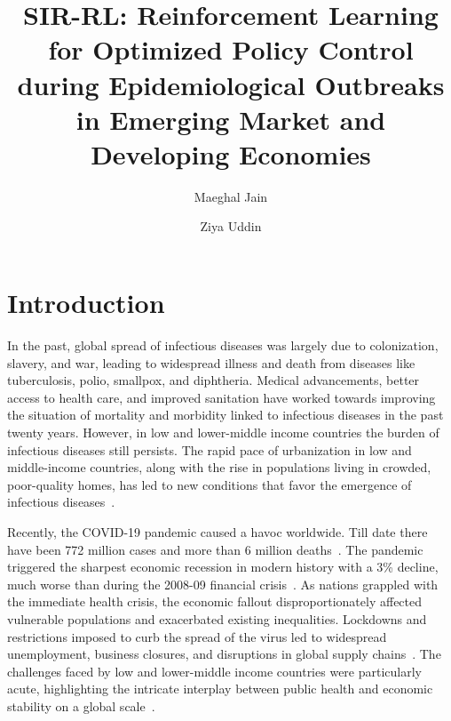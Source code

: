 \documentclass[tikz,fleqn,12pt]{wlscirep}
\title{SIR-RL: Reinforcement Learning for Optimized Policy Control during Epidemiological Outbreaks in Emerging Market and Developing Economies}
\author[1,*]{Maeghal Jain}
\author[1]{Ziya Uddin}
\affil[1]{BML Munjal University}
\affil[*]{e-mail: maeghaljain@gmail.com}
\begin{document}
\flushbottom
\maketitle
\thispagestyle{empty}
\section{Introduction}
In the past, global spread of infectious diseases was largely due to colonization, slavery, and war, leading to widespread illness and death from diseases like tuberculosis, polio, smallpox, and diphtheria. Medical advancements, better access to health care, and improved sanitation have worked towards improving the situation of mortality and morbidity linked to infectious diseases in the past twenty years. However, in low and lower-middle income countries the burden of infectious diseases still persists. The rapid pace of urbanization in low and middle-income countries, along with the rise in populations living in crowded, poor-quality homes, has led to new conditions that favor the emergence of infectious diseases~\cite{Baker2022,inequitableworld}.

Recently, the COVID-19 pandemic caused a havoc worldwide. Till date there have been 772 million cases and more than 6 million deaths~\cite{WHOCovid}. The pandemic triggered the sharpest economic recession in modern history with a 3\% decline, much worse than during the 2008-09 financial crisis~\cite{IMFCovid}. As nations grappled with the immediate health crisis, the economic fallout disproportionately affected vulnerable populations and exacerbated existing inequalities. Lockdowns and restrictions imposed to curb the spread of the virus led to widespread unemployment, business closures, and disruptions in global supply chains~\cite{Nicola2020}. The challenges faced by low and lower-middle income countries were particularly acute, highlighting the intricate interplay between public health and economic stability on a global scale~\cite{Gagnon2023}. 
\end{document}
